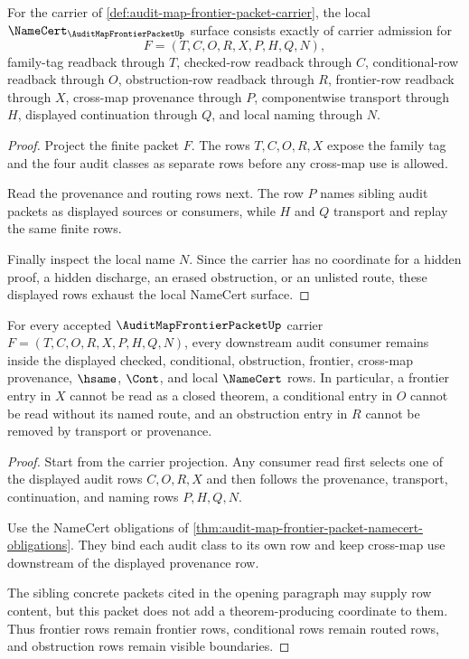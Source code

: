 \begin{theorem}
\label{thm:audit-map-frontier-packet-namecert-obligations}
For the carrier of \autoref{def:audit-map-frontier-packet-carrier}, the local $\NameCert_{\AuditMapFrontierPacketUp}$ surface consists exactly of carrier admission for
$$
F=(T,C,O,R,X,P,H,Q,N),
$$
family-tag readback through $T$, checked-row readback through $C$, conditional-row readback through $O$, obstruction-row readback through $R$, frontier-row readback through $X$, cross-map provenance through $P$, componentwise transport through $H$, displayed continuation through $Q$, and local naming through $N$.
\end{theorem}
\begin{proof}
Project the finite packet $F$. The rows $T,C,O,R,X$ expose the family tag and the four audit classes as separate rows before any cross-map use is allowed.

Read the provenance and routing rows next. The row $P$ names sibling audit packets as displayed sources or consumers, while $H$ and $Q$ transport and replay the same finite rows.

Finally inspect the local name $N$. Since the carrier has no coordinate for a hidden proof, a hidden discharge, an erased obstruction, or an unlisted route, these displayed rows exhaust the local NameCert surface.
\end{proof}

\begin{theorem}
\label{thm:audit-map-frontier-packet-nonescape}
For every accepted $\AuditMapFrontierPacketUp$ carrier $F=(T,C,O,R,X,P,H,Q,N)$, every downstream audit consumer remains inside the displayed checked, conditional, obstruction, frontier, cross-map provenance, $\hsame$, $\Cont$, and local $\NameCert$ rows. In particular, a frontier entry in $X$ cannot be read as a closed theorem, a conditional entry in $O$ cannot be read without its named route, and an obstruction entry in $R$ cannot be removed by transport or provenance.
\end{theorem}
\begin{proof}
Start from the carrier projection. Any consumer read first selects one of the displayed audit rows $C,O,R,X$ and then follows the provenance, transport, continuation, and naming rows $P,H,Q,N$.

Use the NameCert obligations of \autoref{thm:audit-map-frontier-packet-namecert-obligations}. They bind each audit class to its own row and keep cross-map use downstream of the displayed provenance row.

The sibling concrete packets cited in the opening paragraph may supply row content, but this packet does not add a theorem-producing coordinate to them. Thus frontier rows remain frontier rows, conditional rows remain routed rows, and obstruction rows remain visible boundaries.
\end{proof}


